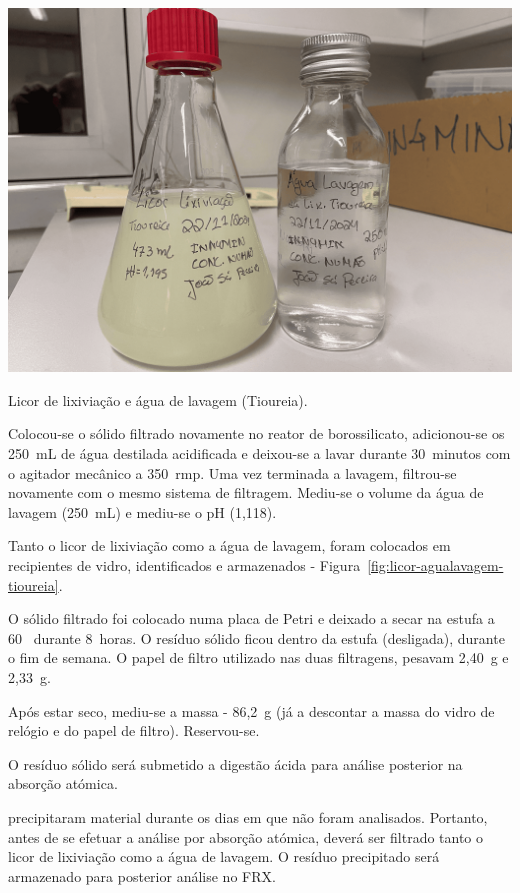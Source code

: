 \begin{marginfigure}
    \centering
    \includegraphics[width=0.9\linewidth]{figures/Lixiviação Tioureia (Licor e Água de Lavagem).png}
    \caption{Licor de lixiviação e água de lavagem (Tioureia).}
    \label{fig:licor-agualavagem-tioureia}
\end{marginfigure}

Colocou-se o sólido filtrado novamente no reator de borossilicato, adicionou-se os 250~mL de água destilada acidificada e deixou-se a lavar durante 30~minutos com o agitador mecânico a 350~rmp.
Uma vez terminada a lavagem, filtrou-se novamente com o mesmo sistema de filtragem.
Mediu-se o volume da água de lavagem (250~mL) e mediu-se o pH (1,118).

Tanto o licor de lixiviação como a água de lavagem, foram colocados em recipientes de vidro, identificados e armazenados - Figura~\ref{fig:licor-agualavagem-tioureia}.

O sólido filtrado foi colocado numa placa de Petri e deixado a secar na estufa a 60~\graus{} durante 8~horas.
O resíduo sólido ficou dentro da estufa (desligada), durante o fim de semana.
O papel de filtro utilizado nas duas filtragens, pesavam 2,40~g e 2,33~g.

Após estar seco, mediu-se a massa - 86,2~g (já a descontar a massa do vidro de relógio e do papel de filtro). 
Reservou-se.

O resíduo sólido será submetido a digestão ácida para análise posterior na absorção atómica.

 precipitaram material durante os dias em que não foram analisados.
Portanto, antes de se efetuar a análise por absorção atómica, deverá ser filtrado tanto o licor de lixiviação como a água de lavagem. 
O resíduo precipitado será armazenado para posterior análise no FRX.

